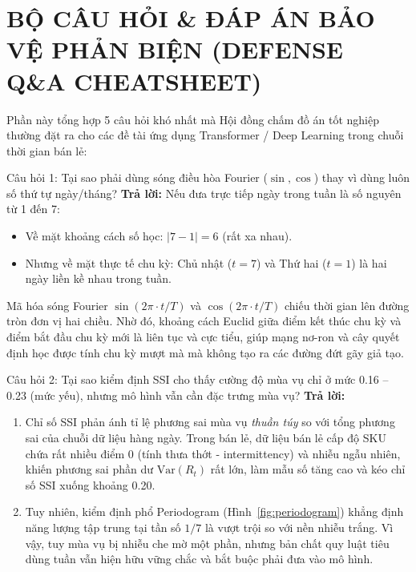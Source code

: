 \documentclass[12pt,a4paper,oneside]{article}
\begin{document}
\newpage
\section{BỘ CÂU HỎI \& ĐÁP ÁN BẢO VỆ PHẢN BIỆN (DEFENSE Q\&A CHEATSHEET)}
\label{sec:bo_cau_hoi_phan_bien}

Phần này tổng hợp 5 câu hỏi khó nhất mà Hội đồng chấm đồ án tốt nghiệp thường đặt ra cho các đề tài ứng dụng Transformer / Deep Learning trong chuỗi thời gian bán lẻ:

\begin{defensebox}{Câu hỏi 1: Tại sao phải dùng sóng điều hòa Fourier ($\sin, \cos$) thay vì dùng luôn số thứ tự ngày/tháng?}
    \textbf{Trả lời:} Nếu đưa trực tiếp ngày trong tuần là số nguyên từ 1 đến 7:
    \begin{itemize}
        \item Về mặt khoảng cách số học: $|7 - 1| = 6$ (rất xa nhau).
        \item Nhưng về mặt thực tế chu kỳ: Chủ nhật ($t=7$) và Thứ hai ($t=1$) là hai ngày liền kề nhau trong tuần.
    \end{itemize}
    Mã hóa sóng Fourier $\sin(2\pi \cdot t/T)$ và $\cos(2\pi \cdot t/T)$ chiếu thời gian lên đường tròn đơn vị hai chiều. Nhờ đó, khoảng cách Euclid giữa điểm kết thúc chu kỳ và điểm bắt đầu chu kỳ mới là liên tục và cực tiểu, giúp mạng nơ-ron và cây quyết định học được tính chu kỳ mượt mà mà không tạo ra các đường đứt gãy giả tạo.
\end{defensebox}

\begin{defensebox}{Câu hỏi 2: Tại sao kiểm định SSI cho thấy cường độ mùa vụ chỉ ở mức 0.16 -- 0.23 (mức yếu), nhưng mô hình vẫn cần đặc trưng mùa vụ?}
    \textbf{Trả lời:}
    \begin{enumerate}
        \item Chỉ số SSI phản ánh tỉ lệ phương sai mùa vụ \textit{thuần túy} so với tổng phương sai của chuỗi dữ liệu hàng ngày. Trong bán lẻ, dữ liệu bán lẻ cấp độ SKU chứa rất nhiều điểm 0 (tính thưa thớt - intermittency) và nhiễu ngẫu nhiên, khiến phương sai phần dư $\text{Var}(R_t)$ rất lớn, làm mẫu số tăng cao và kéo chỉ số SSI xuống khoảng 0.20.
        \item Tuy nhiên, kiểm định phổ Periodogram (Hình~\ref{fig:periodogram}) khẳng định năng lượng tập trung tại tần số $1/7$ là vượt trội so với nền nhiễu trắng. Vì vậy, tuy mùa vụ bị nhiễu che mờ một phần, nhưng bản chất quy luật tiêu dùng tuần vẫn hiện hữu vững chắc và bắt buộc phải đưa vào mô hình.
    \end{enumerate}
\end{defensebox}
\end{document}
